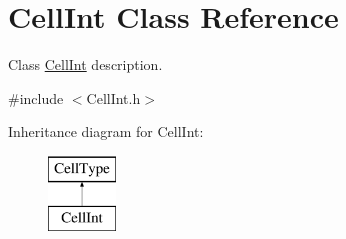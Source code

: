 \hypertarget{class_cell_int}{}\section{Cell\+Int Class Reference}
\label{class_cell_int}


Class \hyperlink{class_cell_int}{Cell\+Int} description.  




{\ttfamily \#include $<$Cell\+Int.\+h$>$}

Inheritance diagram for Cell\+Int\+:\begin{figure}[H]
\begin{center}
\leavevmode
\includegraphics[height=2.000000cm]{class_cell_int}
\end{center}
\end{figure}
